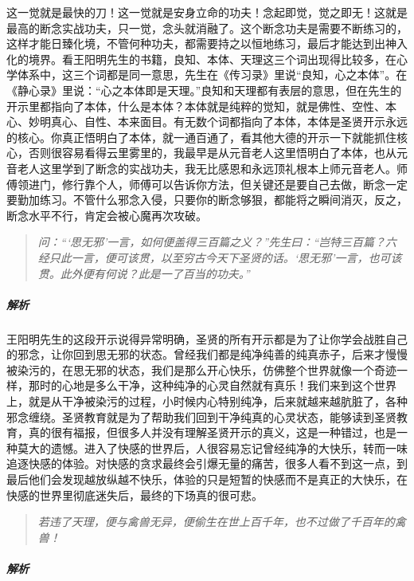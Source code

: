 这一觉就是最快的刀！这一觉就是安身立命的功夫！念起即觉，觉之即无！这就是最高的断念实战功夫，只一觉，念头就消融了。这个断念功夫是需要不断练习的，这样才能日臻化境，不管何种功夫，都需要持之以恒地练习，最后才能达到出神入化的境界。看王阳明先生的书籍，良知、本体、天理这三个词出现得比较多，在心学体系中，这三个词都是同一意思，先生在《传习录》里说“良知，心之本体”。在《静心录》里说：“心之本体即是天理。”良知和天理都有表层的意思，但在先生的开示里都指向了本体，什么是本体？本体就是纯粹的觉知，就是佛性、空性、本心、妙明真心、自性、本来面目。有无数个词都指向了本体，本体是圣贤开示永远的核心。你真正悟明白了本体，就一通百通了，看其他大德的开示一下就能抓住核心，否则很容易看得云里雾里的，我最早是从元音老人这里悟明白了本体，也从元音老人这里学到了断念的实战功夫，我无比感恩和永远顶礼根本上师元音老人。师傅领进门，修行靠个人，师傅可以告诉你方法，但关键还是要自己去做，断念一定要勤加练习。不管什么邪念入侵，只要你的断念够狠，都能将之瞬间消灭，反之，断念水平不行，肯定会被心魔再次攻破。

\begin{quote}\it
    问：“‘思无邪’一言，如何便盖得三百篇之义？”先生曰：“岂特三百篇？六经只此一言，便可该贯，以至穷古今天下圣贤的话。‘思无邪’一言，也可该贯。此外便有何说？此是一了百当的功夫。”
\end{quote}

\subparagraph{解析}

王阳明先生的这段开示说得异常明确，圣贤的所有开示都是为了让你学会战胜自己的邪念，让你回到思无邪的状态。曾经我们都是纯净纯善的纯真赤子，后来才慢慢被染污的，在思无邪的状态，我们是那么开心快乐，仿佛整个世界就像一个奇迹一样，那时的心地是多么干净，这种纯净的心灵自然就有真乐！我们来到这个世界上，就是从干净被染污的过程，小时候内心特别纯净，后来就越来越肮脏了，各种邪念缠绕。圣贤教育就是为了帮助我们回到干净纯真的心灵状态，能够读到圣贤教育，真的很有福报，但很多人并没有理解圣贤开示的真义，这是一种错过，也是一种莫大的遗憾。进入了快感的世界后，人很容易忘记曾经纯净的大快乐，转而一味追逐快感的体验。对快感的贪求最终会引爆无量的痛苦，很多人看不到这一点，到最后他们会发现越放纵越不快乐，体验的只是短暂的快感而不是真正的大快乐，在快感的世界里彻底迷失后，最终的下场真的很可悲。

\begin{quote}\it
    若违了天理，便与禽兽无异，便偷生在世上百千年，也不过做了千百年的禽兽！
\end{quote}

\subparagraph{解析}


